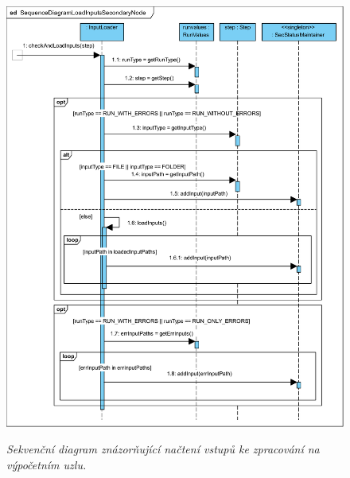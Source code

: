 \begin{figure}[H]
\begin{center}
    \scalebox{0.5}
    {
        \includegraphics{images/SequenceDiagramLoadInputsSecondaryNode.pdf}
    }
    \caption{\label{obr:sequenceDiagramLoadInputsSecondaryNode} {\it Sekvenční diagram znázorňující načtení vstupů ke zpracování na výpočetním uzlu.}}
\end{center}
\end{figure}

